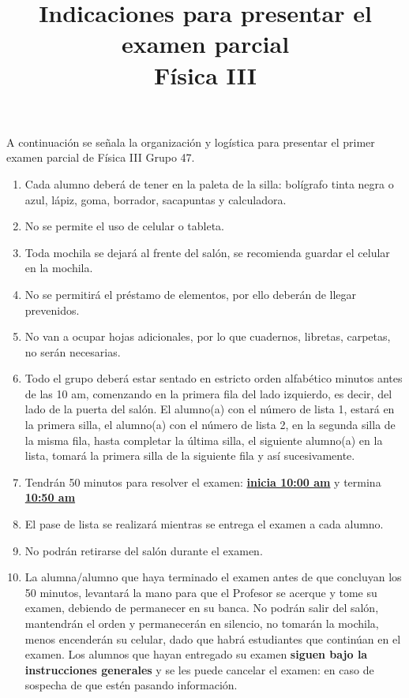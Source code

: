 \documentclass[14pt]{extarticle}
\title{\vspace*{-2cm} Indicaciones para presentar el examen parcial \\  Física III\vspace{-5ex}}
\date{}
\begin{document}
\maketitle

\large

A continuación se señala la organización y logística para presentar el primer examen parcial de Física III Grupo 47.

\begin{enumerate}
\item Cada alumno deberá de tener en la paleta de la silla: bolígrafo tinta negra o azul, lápiz, goma, borrador, sacapuntas y calculadora.
\item No se permite el uso de celular o tableta.
\item Toda mochila se dejará al frente del salón, se recomienda guardar el celular en la mochila.
\item No se permitirá el préstamo de elementos, por ello deberán de llegar prevenidos.
\item No van a ocupar hojas adicionales, por lo que cuadernos, libretas, carpetas, no serán necesarias.
\item Todo el grupo deberá estar sentado en estricto orden alfabético minutos antes de las 10 am, comenzando en la primera fila del lado izquierdo, es decir, del lado de la puerta del salón. El alumno(a) con el número de lista 1, estará en la primera silla, el alumno(a) con el número de lista 2, en la segunda silla de la misma fila, hasta completar la última silla, el siguiente alumno(a) en la lista, tomará la primera silla de la siguiente fila y así sucesivamente.
\item Tendrán 50 minutos para resolver el examen: \textbf{\underline{inicia 10:00 am}} y termina \textbf{\underline{10:50 am}}
\item El pase de lista se realizará mientras se entrega el examen a cada alumno.
\item No podrán retirarse del salón durante el examen.
\item La alumna/alumno que haya terminado el examen antes de que concluyan los 50 minutos, levantará la mano para que el Profesor se acerque y tome su examen, debiendo de permanecer en su banca. No podrán salir del salón, mantendrán el orden y permanecerán en silencio, no tomarán la mochila, menos encenderán su celular, dado que habrá estudiantes que continúan en el examen. Los alumnos que hayan entregado su examen \textbf{siguen bajo la instrucciones generales} y se les puede cancelar el examen: en caso de sospecha de que estén pasando información.

\end{enumerate}
\end{document}
